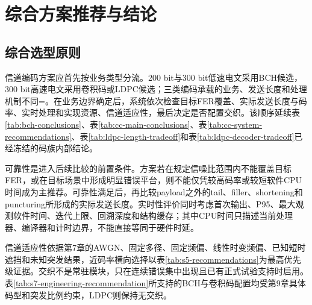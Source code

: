 \chapter{综合方案推荐与结论}\label{chap:recommendation}

\section{综合选型原则}

信道编码方案应首先按业务类型分流。200 bit与300 bit低速电文采用BCH候选，300 bit高速电文采用卷积码或LDPC候选；三类编码承载的业务、发送长度和处理机制不同=。在业务边界确定后，系统依次检查目标FER覆盖、实际发送长度与码率、实时处理和实现资源、信道适应性，最后决定是否配置交织。该顺序延续表\ref{tab:bch-conclusions}、表\ref{tab:cc-main-conclusions}、表\ref{tab:cc-system-recommendations}、表\ref{tab:ldpc-length-tradeoff}和表\ref{tab:ldpc-decoder-tradeoff}已经冻结的码族内部结论。

可靠性是进入后续比较的前置条件。方案若在规定信噪比范围内不能覆盖目标FER，或在目标场景中形成明显错误平台，则不能仅凭较高码率或较短软件CPU时间成为主推荐。可靠性满足后，再比较payload之外的tail、filler、shortening和puncturing所形成的实际发送长度。实时性评价同时考虑首次输出、P95、最大观测软件时间、迭代上限、回溯深度和结构缓存；其中CPU时间只描述当前处理器、编译器和计时边界，不能直接等同于硬件时延。

信道适应性依据第7章的AWGN、固定多径、固定频偏、线性时变频偏、已知短时遮挡和未知突发结果，近码率横向选择以表\ref{tab:s5-recommendations}为最高优先级证据。交织不是常驻模块，只在连续错误集中出现且已有正式试验支持时启用。表\ref{tab:s7-engineering-recommendation}所支持的BCH与卷积码配置均受第9章具体码型和突发比例约束，LDPC则保持无交织。

